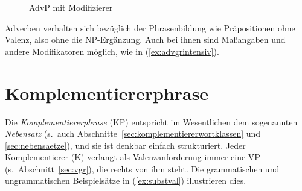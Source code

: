 \begin{figure}
  \centering
  \caption{AdvP mit Modifizierer}
  \label{fig:advgrintensiv}
\end{figure}

Adverben verhalten sich bezüglich der Phrasenbildung wie Präpositionen ohne Valenz, also ohne die NP-Ergänzung.
Auch bei ihnen sind Maßangaben und andere Modifikatoren möglich, wie in (\ref{ex:advgrintensiv}).

\begin{exe}
  \ex\label{ex:advgrintensiv} 
  \begin{xlist}
  \end{xlist}
\end{exe}

\section{Komplementiererphrase}

\label{sec:subjgr}


Die \textit{Komplementiererphrase} (KP) entspricht im Wesentlichen dem sogenannten \textit{Nebensatz} (s.\ auch Abschnitte~\ref{sec:komplementiererwortklassen} und \ref{sec:nebensaetze}), und sie ist denkbar einfach strukturiert.
Jeder Komplementierer (K) verlangt als Valenzanforderung immer eine VP (s.\ Abschnitt~\ref{sec:vgr}), die rechts von ihm steht.
Die grammatischen und ungrammatischen Beispielsätze in (\ref{ex:substval}) illustrieren dies.

\begin{exe}
  \ex\label{ex:substval}
  \begin{xlist}
  \end{xlist}
\end{exe}

